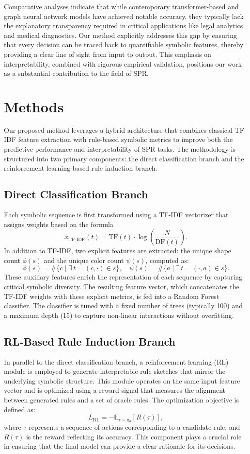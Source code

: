 \documentclass{article}
\begin{document}
Comparative analyses indicate that while contemporary transformer-based and graph neural network models have achieved notable accuracy, they typically lack the explanatory transparency required in critical applications like legal analytics and medical diagnostics. Our method explicitly addresses this gap by ensuring that every decision can be traced back to quantifiable symbolic features, thereby providing a clear line of sight from input to output. This emphasis on interpretability, combined with rigorous empirical validation, positions our work as a substantial contribution to the field of SPR.

\section{Methods}
Our proposed method leverages a hybrid architecture that combines classical TF-IDF feature extraction with rule-based symbolic metrics to improve both the predictive performance and interpretability of SPR tasks. The methodology is structured into two primary components: the direct classification branch and the reinforcement learning-based rule induction branch.

\subsection{Direct Classification Branch}
Each symbolic sequence is first transformed using a TF-IDF vectorizer that assigns weights based on the formula
\[
x_{\mathrm{TF\text{-}IDF}}(t) = \mathrm{TF}(t) \cdot \log\left(\frac{N}{\mathrm{DF}(t)}\right).
\]
In addition to TF-IDF, two explicit features are extracted: the unique shape count \(\phi(s)\) and the unique color count \(\psi(s)\), computed as:
\[
\phi(s) = \#\{ c \mid \exists \, t=(c,\cdot) \in s \},\quad \psi(s) = \#\{ a \mid \exists \, t=(\cdot,a) \in s \}.
\]
These auxiliary features enrich the representation of each sequence by capturing critical symbolic diversity. The resulting feature vector, which concatenates the TF-IDF weights with these explicit metrics, is fed into a Random Forest classifier. The classifier is tuned with a fixed number of trees (typically 100) and a maximum depth (15) to capture non-linear interactions without overfitting.

\subsection{RL-Based Rule Induction Branch}
In parallel to the direct classification branch, a reinforcement learning (RL) module is employed to generate interpretable rule sketches that mirror the underlying symbolic structure. This module operates on the same input feature vector and is optimized using a reward signal that measures the alignment between generated rules and a set of oracle rules. The optimization objective is defined as:
\[
L_{\mathrm{RL}} = -\mathbb{E}_{\tau \sim \pi_{\theta}}[R(\tau)],
\]
where \(\tau\) represents a sequence of actions corresponding to a candidate rule, and \(R(\tau)\) is the reward reflecting its accuracy. This component plays a crucial role in ensuring that the final model can provide a clear rationale for its decisions.
\end{document}
